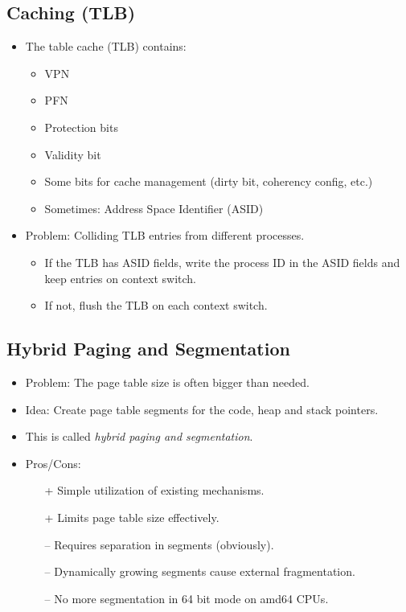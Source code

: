 		\subsection{Caching (TLB)} %
			\label{sec:cachingpaging}


			\begin{itemize}
				\item The table cache (TLB) contains:
					\begin{itemize}
						\item VPN
						\item PFN
						\item Protection bits
						\item Validity bit
						\item Some bits for cache management (dirty bit, coherency config, etc.)
						\item Sometimes: Address Space Identifier (ASID)
					\end{itemize}
				\item Problem: Colliding TLB entries from different processes.
					\begin{itemize}
						\item If the TLB has ASID fields, write the process ID in the ASID fields and keep entries on context switch.
						\item If not, flush the TLB on each context switch.
					\end{itemize}
			\end{itemize}

		\subsection{Hybrid Paging and Segmentation}
			\label{sec:hybridpaging}

			\begin{itemize}
				\item Problem: The page table size is often bigger than needed.
				\item Idea: Create page table segments for the code, heap and stack pointers.
				\item This is called \textit{hybrid paging and segmentation}.
				\item Pros/Cons:
					\begin{itemize}
						\item[+] Simple utilization of existing mechanisms.
						\item[+] Limits page table size effectively.
						\item[--] Requires separation in segments (obviously).
						\item[--] Dynamically growing segments cause external fragmentation.
						\item[--] No more segmentation in 64 bit mode on amd64 CPUs.
					\end{itemize}
			\end{itemize}


